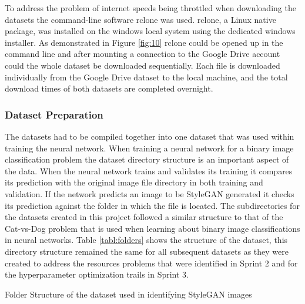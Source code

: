 To address the problem of internet speeds being throttled when downloading the datasets the command-line software rclone was used. rclone, a Linux native package, was installed on the windows local system using the dedicated windows installer. As demonstrated in Figure \ref{fig:10} rclone could be opened up in the command line and after mounting a connection to the Google Drive account could the whole dataset be downloaded sequentially. Each file is downloaded individually from the Google Drive dataset to the local machine, and the total download times of both datasets are completed overnight.

\subsubsection{Dataset Preparation}

The datasets had to be compiled together into one dataset that was used within training the neural network. When training a neural network for a binary image classification problem the dataset directory structure is an important aspect of the data. When the neural network trains and validates its training it compares its prediction with the original image file directory in both training and validation. If the network predicts an image to be StyleGAN generated it checks its prediction against the folder in which the file is located. The subdirectories for the datasets created in this project followed a similar structure to that of the Cat-vs-Dog problem that is used when learning about binary image classifications in neural networks. Table \ref{tabl:folders} shows the structure of the dataset, this directory structure remained the same for all subsequent datasets as they were created to address the resources problems that were identified in Sprint 2 and for the hyperparameter optimization trails in Sprint 3.

\begin{table}[H]%
\caption{Folder Structure of the dataset used in identifying StyleGAN images}
\label{tabl:folders}
\center
\small
{}
\end{table}

